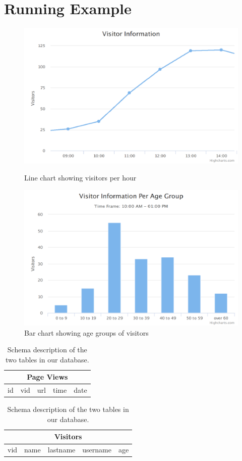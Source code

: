
\section{Running Example}


\begin{figure}[t]
  \centering
  \includegraphics[width=0.8\columnwidth]{figures/first-line.png}
  \caption{Line chart showing visitors per hour}
\label{figure:first-running-example:first-line-chart}
   \vspace*{0.1cm}
  \includegraphics[width=0.8\columnwidth]{figures/first-bar.png}
  \caption{Bar chart showing age groups of visitors}
  \label{figure:first-running-example:first-bar-chart}
\end{figure}

\begin{table}
\begin{center}

\begin{tabular}{|c|c|c|c|c|}
\hline 
\multicolumn{5}{|c|}{Page Views} \\ 
\hline 
id & vid & url & time & date \\ 
\hline 
\end{tabular} 

\hfill

\begin{tabular}{|c|c|c|c|c|}
\hline 
\multicolumn{5}{|c|}{Visitors} \\ 
\hline 
vid & name & lastname & username & age \\ 
\hline 
\end{tabular} 

\end{center}
\caption{Schema description of the two tables in our database.}
\label{tab:schema}
\end{table}


